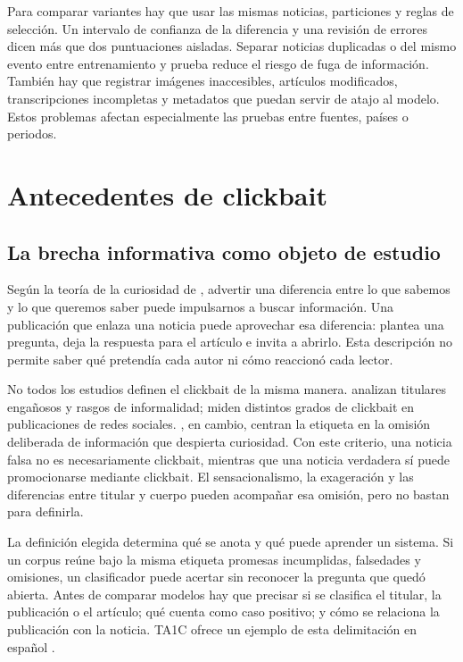 Para comparar variantes hay que usar las mismas noticias, particiones y reglas de selección. Un intervalo de confianza de la diferencia y una revisión de errores dicen más que dos puntuaciones aisladas. Separar noticias duplicadas o del mismo evento entre entrenamiento y prueba reduce el riesgo de fuga de información. También hay que registrar imágenes inaccesibles, artículos modificados, transcripciones incompletas y metadatos que puedan servir de atajo al modelo. Estos problemas afectan especialmente las pruebas entre fuentes, países o periodos.

\section{Antecedentes de clickbait}

\subsection{La brecha informativa como objeto de estudio}
\label{sec:definicion}

Según la teoría de la curiosidad de \citet{loewenstein1994}, advertir una diferencia entre lo que sabemos y lo que queremos saber puede impulsarnos a buscar información. Una publicación que enlaza una noticia puede aprovechar esa diferencia: plantea una pregunta, deja la respuesta para el artículo e invita a abrirlo. Esta descripción no permite saber qué pretendía cada autor ni cómo reaccionó cada lector.

No todos los estudios definen el clickbait de la misma manera. \citet{biyani2016} analizan titulares engañosos y rasgos de informalidad; \citet{potthast2018} miden distintos grados de clickbait en publicaciones de redes sociales. \citet{mordecki2025}, en cambio, centran la etiqueta en la omisión deliberada de información que despierta curiosidad. Con este criterio, una noticia falsa no es necesariamente clickbait, mientras que una noticia verdadera sí puede promocionarse mediante clickbait. El sensacionalismo, la exageración y las diferencias entre titular y cuerpo pueden acompañar esa omisión, pero no bastan para definirla.

La definición elegida determina qué se anota y qué puede aprender un sistema. Si un corpus reúne bajo la misma etiqueta promesas incumplidas, falsedades y omisiones, un clasificador puede acertar sin reconocer la pregunta que quedó abierta. Antes de comparar modelos hay que precisar si se clasifica el titular, la publicación o el artículo; qué cuenta como caso positivo; y cómo se relaciona la publicación con la noticia. TA1C ofrece un ejemplo de esta delimitación en español \citep{mordecki2025}.

